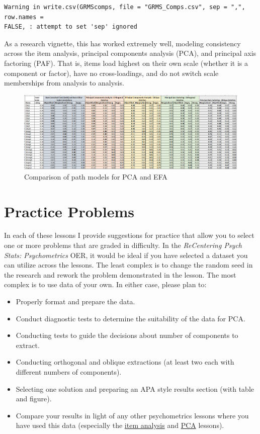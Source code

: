 \documentclass[
  english,
]{book}
\providecommand{\tightlist}{%
  \setlength{\itemsep}{0pt}\setlength{\parskip}{0pt}}
\begin{document}
\begin{verbatim}
Warning in write.csv(GRMScomps, file = "GRMS_Comps.csv", sep = ",", row.names =
FALSE, : attempt to set 'sep' ignored
\end{verbatim}

As a research vignette, this has worked extremely well, modeling consistency across the item analysis, principal components analysis (PCA), and principal axis factoring (PAF). That is, items load highest on their own scale (whether it is a component or factor), have no cross-loadings, and do not switch scale memberships from analysis to analysis.

\begin{figure}
\centering
\includegraphics{images/PAF/GRMScomps.png}
\caption{Comparison of path models for PCA and EFA}
\end{figure}

\hypertarget{practice-problems-7}{%
\section{Practice Problems}\label{practice-problems-7}}

In each of these lessons I provide suggestions for practice that allow you to select one or more problems that are graded in difficulty. In the \emph{ReCentering Psych Stats: Psychometrics} OER, it would be ideal if you have selected a dataset you can utilize across the lessons. The least complex is to change the random seed in the research and rework the problem demonstrated in the lesson. The most complex is to use data of your own. In either case, please plan to:

\begin{itemize}
\tightlist
\item
  Properly format and prepare the data.
\item
  Conduct diagnostic tests to determine the suitability of the data for PCA.
\item
  Conducting tests to guide the decisions about number of components to extract.
\item
  Conducting orthogonal and oblique extractions (at least two each with different numbers of components).
\item
  Selecting one solution and preparing an APA style results section (with table and figure).
\item
  Compare your results in light of any other psychometrics lessons where you have used this data (especially the \protect\hyperlink{ItemAnalSurvey}{item analysis} and \protect\hyperlink{PCA}{PCA} lessons).
\end{itemize}
\end{document}
